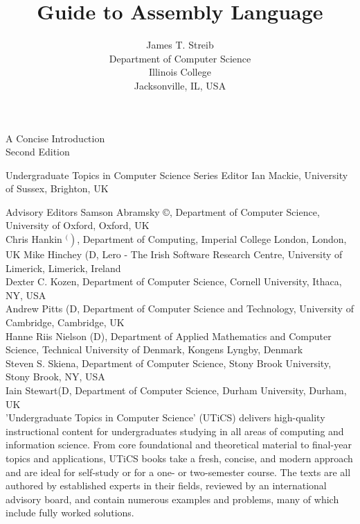 \documentclass[10pt]{book}
\title{Guide to Assembly Language }
\author{James T. Streib\\
Department of Computer Science\\
Illinois College\\
Jacksonville, IL, USA}
\date{}
\begin{document}
\tableofcontents


\maketitle
\captionsetup{singlelinecheck=false}


A Concise Introduction\\
Second Edition

Undergraduate Topics in Computer Science
Series Editor
Ian Mackie, University of Sussex, Brighton, UK

Advisory Editors
Samson Abramsky ©, Department of Computer Science, University of Oxford, Oxford, UK\\
Chris Hankin $\left.{ }^{( }\right)$, Department of Computing, Imperial College London, London, UK Mike Hinchey (D, Lero - The Irish Software Research Centre, University of Limerick, Limerick, Ireland\\
Dexter C. Kozen, Department of Computer Science, Cornell University, Ithaca, NY, USA\\
Andrew Pitts (D, Department of Computer Science and Technology, University of Cambridge, Cambridge, UK\\
Hanne Riis Nielson (D), Department of Applied Mathematics and Computer Science, Technical University of Denmark, Kongens Lyngby, Denmark\\
Steven S. Skiena, Department of Computer Science, Stony Brook University, Stony Brook, NY, USA\\
Iain Stewart(D, Department of Computer Science, Durham University, Durham, UK\\

'Undergraduate Topics in Computer Science' (UTiCS) delivers high-quality instructional content for undergraduates studying in all areas of computing and information science. From core foundational and theoretical material to final-year topics and applications, UTiCS books take a fresh, concise, and modern approach and are ideal for self-study or for a one- or two-semester course. The texts are all authored by established experts in their fields, reviewed by an international advisory board, and contain numerous examples and problems, many of which include fully worked solutions.
\end{document}
